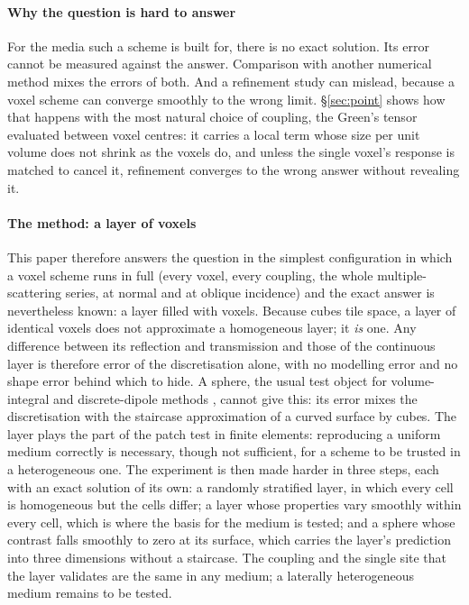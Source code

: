 \documentclass[preprint,review,12pt]{elsarticle}
\begin{document}
\paragraph{Why the question is hard to answer} For the media such a scheme is built for, there is no
exact solution. Its error cannot be measured against the answer. Comparison with another numerical
method mixes the errors of both. And a refinement study can mislead, because a voxel scheme can
converge smoothly to the wrong limit. \S\ref{sec:point} shows how that happens with the most natural
choice of coupling, the Green's tensor evaluated between voxel centres: it carries a local term whose
size per unit volume does not shrink as the voxels do, and unless the single voxel's response is
matched to cancel it, refinement converges to the wrong answer without revealing it.

\paragraph{The method: a layer of voxels} This paper therefore answers the question in the simplest
configuration in which a voxel scheme runs in full (every voxel, every coupling, the whole
multiple-scattering series, at normal and at oblique incidence) and the exact answer is nevertheless
known: a layer filled with voxels. Because cubes tile space, a layer of identical voxels does not
approximate a homogeneous layer; it \emph{is} one. Any difference between its reflection and
transmission and those of the continuous layer is therefore error of the discretisation alone, with no
modelling error and no shape error behind which to hide. A sphere, the usual test object for
volume-integral and discrete-dipole methods \citep{Yurkin2006}, cannot give this: its error mixes the
discretisation with the staircase approximation of a curved surface by cubes. The layer plays the part
of the patch test in finite elements: reproducing a uniform medium correctly is necessary, though not
sufficient, for a scheme to be trusted in a heterogeneous one. The experiment is then made harder in
three steps, each with an exact solution of its own: a randomly stratified layer, in which every cell
is homogeneous but the cells differ; a layer whose properties vary smoothly within every cell, which is
where the basis for the medium is tested; and a sphere whose contrast falls smoothly to zero at its
surface, which carries the layer's prediction into three dimensions without a staircase. The coupling
and the single site that the layer validates are the same in any medium; a laterally heterogeneous
medium remains to be tested.
\end{document}
